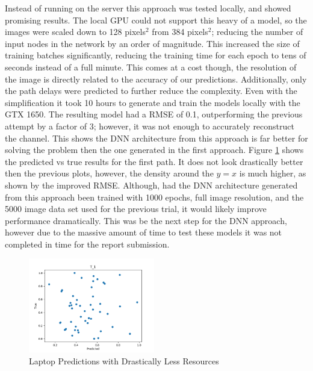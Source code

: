 Instead of running on the server this approach was tested locally, and showed promising results. The local GPU could not support this heavy of a model, so the images were scaled down to 128 pixels\(^{2}\) from 384 pixels\(^2\); reducing the number of input nodes in the network by an order of magnitude. This increased the size of training batches significantly, reducing the training time for each epoch to tens of seconds instead of a full minute. This comes at a cost though, the resolution of the image is directly related to the accuracy of our predictions. Additionally, only the path delays were predicted to further reduce the complexity. Even with the simplification it took 10 hours to generate and train the models locally with the GTX 1650. The resulting model had a RMSE of 0.1, outperforming the previous attempt by a factor of 3; however, it was not enough to accurately reconstruct the channel. This shows the DNN architecture from this approach is far better for solving the problem then the one generated in the first approach. Figure \ref{fig:laptopT} shows the predicted vs true results for the first path. It does not look drastically better then the previous plots, however, the density around the $y=x$ is much higher, as shown by the improved RMSE. Although, had the DNN architecture generated from this approach been trained with 1000 epochs, full image resolution, and the 5000 image data set used for the previous trial, it would likely improve performance dramatically. This was be the next step for the DNN approach, however due to the massive amount of time to test these models it was not completed in time for the report submission.

\begin{figure}[H]
    \centering
    \includegraphics[width=0.49\textwidth]{figures/T_1_laptop.png}
    \caption{Laptop Predictions with Drastically Less Resources}
    \label{fig:laptopT}
\end{figure}
